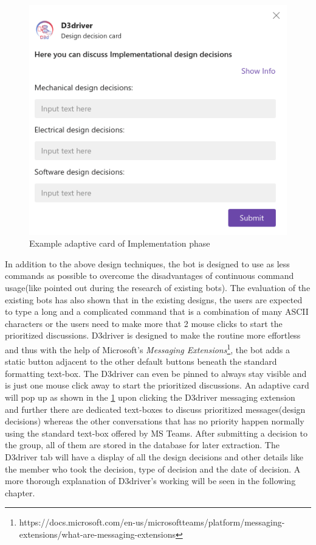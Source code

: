 \begin{figure}
\centering
\includegraphics[width=0.7\linewidth]{figures/decisiontemplate-implementation}
\caption{Example adaptive card of Implementation phase}
\label{fig:decisiontemplate-implementation}
\end{figure}

In addition to the above design techniques, the bot is designed to use as less commands as possible to overcome the disadvantages of continuous command usage(like pointed out during the research of existing bots). The evaluation of the existing bots has also shown that in the existing designs, the users are expected to type a long and a complicated command that is a combination of many ASCII characters or the users need to make more that 2 mouse clicks to start the prioritized discussions. D3driver is designed to make the routine more effortless and thus with the help of Microsoft's \textit{Messaging Extensions}\footnote{https://docs.microsoft.com/en-us/microsoftteams/platform/messaging-extensions/what-are-messaging-extensions}, the bot adds a static button adjacent to the other default buttons beneath the standard formatting text-box. The D3driver can even be pinned to always stay visible and is just one mouse click away to start the prioritized discussions. An adaptive card will pop up as shown in the \ref{fig:decisiontemplate-implementation} upon clicking the D3driver messaging extension and further there are dedicated text-boxes to discuss prioritized messages(design decisions) whereas the other conversations that has no priority happen normally using the standard text-box offered by MS Teams. After submitting a decision to the group, all of them are stored in the database for later extraction. The D3driver tab will have a display of all the design decisions and other details like the member who took the decision, type of decision and the date of decision. A more thorough explanation of D3driver's working will be seen in the following chapter. 



